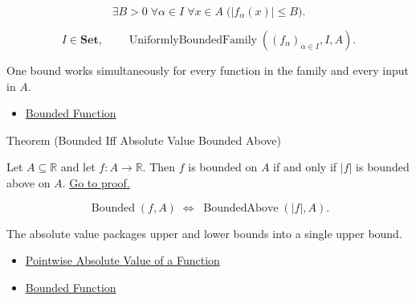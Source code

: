 \begin{remark*}
\[
  \exists B>0\;\forall\alpha\in I\;\forall x\in A\;
  \bigl(|f_\alpha(x)|\leq B\bigr).
\]
\end{remark*}

\begin{remark*}
\[
  I\in\mathbf{Set},\qquad\operatorname{UniformlyBoundedFamily}((f_\alpha)_{\alpha\in I},I,A).
\]
\end{remark*}

\begin{remark*}[Interpretation]
One bound works simultaneously for every function in the family and every
input in \(A\).
\end{remark*}

\begin{dependencies}
\begin{itemize}
  \item \hyperref[def:function-bounded]{Bounded Function}
\end{itemize}
\end{dependencies}

\begin{theorembox}{Theorem (Bounded Iff Absolute Value Bounded Above)}
\begin{theorem}
\label{thm:bounded-iff-absolute-value-bounded-above}
Let \(A\subseteq\mathbb{R}\) and let \(f:A\to\mathbb{R}\).  Then \(f\) is
bounded on \(A\) if and only if \(|f|\) is bounded above on \(A\).
\hyperref[prf:bounded-iff-absolute-value-bounded-above]{Go to proof.}
\end{theorem}
\end{theorembox}

\begin{remark*}
\[
  \operatorname{Bounded}(f,A)
  \;\Longleftrightarrow\;
  \operatorname{BoundedAbove}(|f|,A).
\]
\end{remark*}

\begin{remark*}[Interpretation]
The absolute value packages upper and lower bounds into a single upper bound.
\end{remark*}

\begin{dependencies}
\begin{itemize}
  \item \hyperref[def:pointwise-absolute-value-of-a-function]{Pointwise Absolute Value of a Function}
  \item \hyperref[def:function-bounded]{Bounded Function}
\end{itemize}
\end{dependencies}

